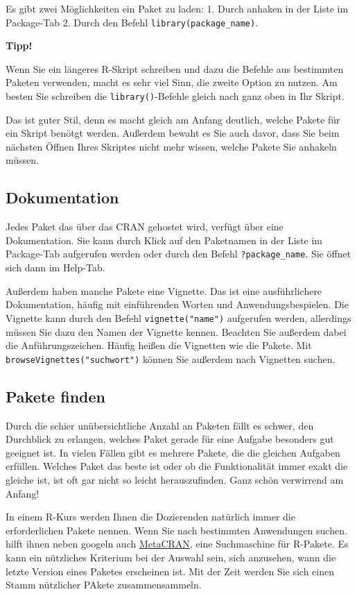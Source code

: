 \documentclass[
]{book}
\begin{document}
Es gibt zwei Möglichkeiten ein Paket zu laden:
1. Durch anhaken in der Liste im Package-Tab
2. Durch den Befehl \texttt{library(package\_name)}.

\textbf{Tipp!}

Wenn Sie ein längeres R-Skript schreiben und dazu die Befehle aus bestimmten Paketen verwenden, macht es sehr viel Sinn, die zweite Option zu nutzen. Am besten Sie schreiben die \texttt{library()}-Befehle gleich nach ganz oben in Ihr Skript.

Das ist guter Stil, denn es macht gleich am Anfang deutlich, welche Pakete für ein Skript benötgt werden. Außerdem bewaht es Sie auch davor, dass Sie beim nächsten Öffnen Ihres Skriptes nicht mehr wissen, welche Pakete Sie anhakeln müssen.

\hypertarget{dokumentation}{%
\subsection{Dokumentation}\label{dokumentation}}

Jedes Paket das über das CRAN gehostet wird, verfügt über eine Dokumentation. Sie kann durch Klick auf den Paketnamen in der Liste im Package-Tab aufgerufen werden oder durch den Befehl \texttt{?package\_name}. Sie öffnet sich dann im Help-Tab.

Außerdem haben manche Pakete eine Vignette. Das ist eine ausführlichere Dokumentation, häufig mit einführenden Worten und Anwendungsbespielen. Die Vignette kann durch den Befehl \texttt{vignette("name")} aufgerufen werden, allerdings müssen Sie dazu den Namen der Vignette kennen. Beachten Sie außerdem dabei die Anführungszeichen. Häufig heißen die Vignetten wie die Pakete. Mit \texttt{browseVignettes("suchwort")} können Sie außerdem nach Vignetten suchen.

\hypertarget{pakete-finden}{%
\subsection{Pakete finden}\label{pakete-finden}}

Durch die schier unübersichtliche Anzahl an Paketen fällt es schwer, den Durchblick zu erlangen, welches Paket gerade für eine Aufgabe besonders gut geeignet ist. In vielen Fällen gibt es mehrere Pakete, die die gleichen Aufgaben erfüllen. Welches Paket das beste ist oder ob die Funktionalität immer exakt die gleiche ist, ist oft gar nicht so leicht herauszufinden. Ganz schön verwirrend am Anfang!

In einem R-Kurs werden Ihnen die Dozierenden natürlich immer die erforderlichen Pakete nennen. Wenn Sie nach bestimmten Anwendungen suchen. hilft ihnen neben googeln auch \href{https://www.r-pkg.org/}{MetaCRAN}, eine Suchmaschine für R-Pakete. Es kann ein nützliches Kriterium bei der Auswahl sein, sich anzusehen, wann die letzte Version eines Paketes erscheinen ist. Mit der Zeit werden Sie sich einen Stamm nützlicher PAkete zusammensammeln.
\end{document}
